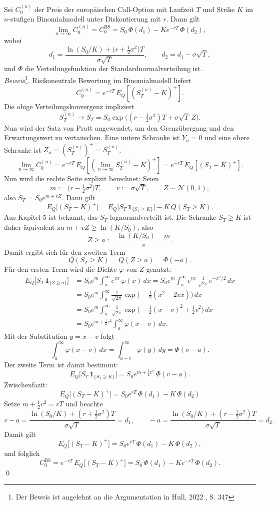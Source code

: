 \begin{satz}
Sei $C_0^{(n)}$ der Preis der europäischen Call-Option mit Laufzeit $T$ und Strike $K$
im $n$-stufigen Binomialmodell unter Diskontierung mit $r$. Dann gilt
$$
\lim_{n\to\infty} C_0^{(n)}
= C_0^{\mathrm{BS}}
= S_0\,\Phi(d_1) - K e^{-rT}\,\Phi(d_2),
$$
wobei
$$
d_1 = \frac{\ln(S_0/K) + \big(r + \tfrac12 \sigma^2\big)T}{\sigma \sqrt{T}},
\qquad
d_2 = d_1 - \sigma \sqrt{T},
$$
und $\Phi$ die Verteilungsfunktion der Standardnormalverteilung ist.
\\ \textit{Beweis}\footnote{Der Beweis ist angelehnt an die Argumentation in Hull, 2022 \cite{hull}, S. 347}. Risikoneutrale Bewertung im Binomialmodell liefert
$$
C_0^{(n)} = e^{-rT}\,E_Q\!\left[(S_T^{(n)} - K)^+\right].
$$
Die obige Verteilungskonvergenz impliziert
$$
S_T^{(n)} \longrightarrow S_T = S_0 \exp\!\big((r-\tfrac12\sigma^2)T + \sigma \sqrt{T}\,Z\big).
$$
Nun wird der Satz von Pratt angewendet, um den Grenzübergang und den Erwartungswert zu vertauschen. Eine untere Schranke ist $Y_n=0$ und eine obere Schranke ist $Z_n = (S_T^{(n)})^+ = S_T^{(n)}$. 
$$
\lim_{n\to\infty} C_0^{(n)} = e^{-rT}\,E_Q\!\left[ (\lim_{n\to\infty} S_T^{(n)}-K)^+ \right] = e^{-rT}\,E_Q\!\left[(S_T - K)^+\right].
$$
Nun wird die rechte Seite explizit berechnet: Seien
$$
m := \big(r-\tfrac12\sigma^2\big)T,\qquad v:=\sigma \sqrt{T},\qquad Z\sim \mathcal N(0,1),
$$
also $S_T = S_0 e^{m + v Z}$. Dann gilt
$$
E_Q\big[(S_T - K)^+\big]
= E_Q\big[S_T\,\mathbf 1_{\{S_T\ge K\}}\big] - K\,Q(S_T\ge K).
$$
Aus Kapitel 5 ist bekannt, das $S_T$ lognormalverteilt ist. Die Schranke $S_T\ge K$ ist daher äquivalent zu $m + vZ \ge \ln(K/S_0)$, also
$$
Z \ge a := \frac{\ln(K/S_0) - m}{v}.
$$
Damit ergibt sich für den zweiten Term
$$
Q(S_T\ge K) = Q(Z\ge a) = \Phi(-a).
$$
Für den ersten Term wird die Dichte $\varphi$ von $Z$ genutzt:
$$
\begin{aligned}
E_Q\big[S_T\,\mathbf 1_{\{Z\ge a\}}\big]
&= S_0 e^{m}\int_a^\infty e^{v x}\,\varphi(x)\,dx
= S_0 e^{m}\int_a^\infty e^{v x}\,\frac{1}{\sqrt{2\pi}}e^{-x^2/2}\,dx \\
&= S_0 e^{m}\int_a^\infty \frac{1}{\sqrt{2\pi}}
\exp\!\Big(-\tfrac12(x^2 - 2 v x)\Big)\,dx \\
&= S_0 e^{m}\int_a^\infty \frac{1}{\sqrt{2\pi}}
\exp\!\Big(-\tfrac12(x - v)^2 + \tfrac12 v^2\Big)\,dx \\
&= S_0 e^{m + \frac12 v^2}\int_a^\infty \varphi(x - v)\,dx.
\end{aligned}
$$
Mit der Substitution $y=x-v$ folgt
$$
\int_a^\infty \varphi(x - v)\,dx = \int_{a-v}^\infty \varphi(y)\,dy = \Phi(v-a).
$$
Der zweite Term ist damit bestimmt:
$$
E_Q\big[S_T\,\mathbf 1_{\{S_T\ge K\}}\big]
= S_0 e^{m + \frac12 v^2}\,\Phi(v-a).
$$
Zwischenfazit:
$$
E_Q\big[(S_T - K)^+\big] = S_0 e^{rT}\,\Phi(d_1) - K\,\Phi(d_2)
$$
Setze $m+\tfrac12 v^2 = rT$ und beachte
$$
v-a = \frac{\ln(S_0/K) + (r+\tfrac12\sigma^2)T}{\sigma \sqrt{T}} = d_1,
\qquad
-a = \frac{\ln(S_0/K) + (r-\tfrac12\sigma^2)T}{\sigma \sqrt{T}} = d_2.
$$
Damit gilt
$$
E_Q\big[(S_T - K)^+\big]
= S_0 e^{rT}\,\Phi(d_1) - K\,\Phi(d_2),
$$
und folglich
$$
C_0^{\mathrm{BS}} = e^{-rT}\,E_Q\big[(S_T - K)^+\big]
= S_0\,\Phi(d_1) - K e^{-rT}\,\Phi(d_2).
$$
\qed
\end{satz}

